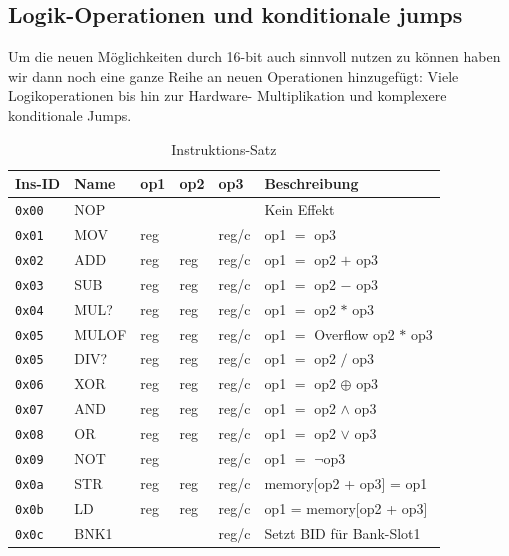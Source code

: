 \documentclass{scrartcl}
\begin{document}
    \subsection{Logik-Operationen und konditionale jumps}
    Um die neuen Möglichkeiten durch 16-bit auch sinnvoll nutzen zu können haben wir dann noch eine ganze Reihe an neuen Operationen hinzugefügt:
    Viele Logikoperationen bis hin zur Hardware- Multiplikation und komplexere konditionale Jumps.
    \begin{center}
        \begin{table}
            \caption{\label{table:instructions}Instruktions-Satz}
            \begin{tabular}{l | l l l l | l}
                Ins-ID & Name & op1 & op2 & op3 & Beschreibung \\
                \hline
                \texttt{0x00} & NOP  &  &  &  & Kein Effekt  \\
                \hline
                \texttt{0x01} & MOV  & reg &  & reg/c & op1 $=$ op3\\
                \texttt{0x02} & ADD  & reg & reg & reg/c & op1 $=$ op2 $+$ op3 \\
                \texttt{0x03} & SUB  & reg & reg & reg/c & op1 $=$ op2 $-$ op3 \\
                \texttt{0x04} & MUL? & reg & reg & reg/c & op1 $=$ op2 $*$ op3 \\
                \texttt{0x05} & MULOF& reg & reg & reg/c & op1 $=$ Overflow op2 $*$ op3 \\
                \texttt{0x05} & DIV? & reg & reg & reg/c & op1 $=$ op2 $/$ op3 \\
                \texttt{0x06} & XOR  & reg & reg & reg/c & op1 $=$ op2 $\oplus$ op3 \\
                \texttt{0x07} & AND  & reg & reg & reg/c & op1 $=$ op2 $\land$ op3 \\
                \texttt{0x08} & OR   & reg & reg & reg/c & op1 $=$ op2 $\lor$ op3 \\
                \texttt{0x09} & NOT  & reg &  & reg/c & op1 $=$ $\lnot$op3 \\
                \hline
                \texttt{0x0a} & STR  & reg & reg & reg/c & memory[op2 + op3] = op1  \\
                \texttt{0x0b} & LD   & reg & reg & reg/c & op1 = memory[op2 + op3] \\
                \texttt{0x0c} & BNK1 &  &  & reg/c & Setzt BID für Bank-Slot1 \\

\end{tabular}
\end{table}
\end{center}
\end{document}

